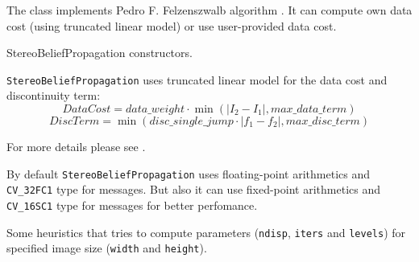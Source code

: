 The class implements Pedro F. Felzenszwalb algorithm \cite{felzenszwalb_bp}. It can compute own data cost (using truncated linear model) or use user-provided data cost.


StereoBeliefPropagation constructors.


\begin{description}
\end{description}

\texttt{StereoBeliefPropagation} uses truncated linear model for the data cost and discontinuity term:
\[ 
DataCost = data\_weight \cdot \min(\lvert I_2-I_1 \rvert, max\_data\_term)
\]
\[
DiscTerm = \min(disc\_single\_jump \cdot \lvert f_1-f_2 \rvert, max\_disc\_term)
\]

For more details please see \cite{felzenszwalb_bp}.

By default \texttt{StereoBeliefPropagation} uses floating-point arithmetics and \texttt{CV\_32FC1} type for messages. But also it can use fixed-point arithmetics and \texttt{CV\_16SC1} type for messages for better perfomance.


Some heuristics that tries to compute parameters (\texttt{ndisp}, \texttt{iters} and \texttt{levels}) for specified image size (\texttt{width} and \texttt{height}).

